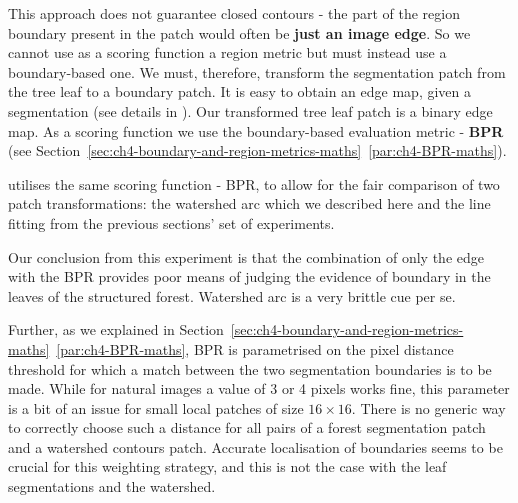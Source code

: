 This approach does not guarantee closed contours - the part of the region boundary present in the patch would often be {\bf just an image edge}. So we cannot use as a scoring function a region metric but must instead use a boundary-based one. We must, therefore, transform the segmentation patch from the tree leaf to a boundary patch. It is easy to obtain an edge map, given a segmentation (see details in ). Our transformed tree leaf patch is a binary edge map. As a scoring function we use the boundary-based evaluation metric - {\bf BPR} (see Section~\ref*{sec:ch4-boundary-and-region-metrics-maths}~\ref{par:ch4-BPR-maths}).

 utilises the same scoring function - BPR, to allow for the fair comparison of two patch transformations: the watershed arc which we described here and the line fitting from the previous sections' set of experiments. 

Our conclusion from this experiment is that the combination of only the edge with the BPR provides poor means of judging the evidence of boundary in the leaves of the structured forest. Watershed arc is a very brittle cue per se. %

Further, as we explained in Section~\ref*{sec:ch4-boundary-and-region-metrics-maths}~\ref{par:ch4-BPR-maths}, BPR is parametrised on the pixel distance threshold for which a match between the two segmentation boundaries is to be made. While for natural images a value of 3 or 4 pixels works fine, this parameter is a bit of an issue for small local patches of size $16\times 16$. There is no generic way to correctly choose such a distance for all pairs of a forest segmentation patch and a watershed contours patch. Accurate localisation of boundaries seems to be crucial for this weighting strategy, and this is not the case with the leaf segmentations and the watershed.

